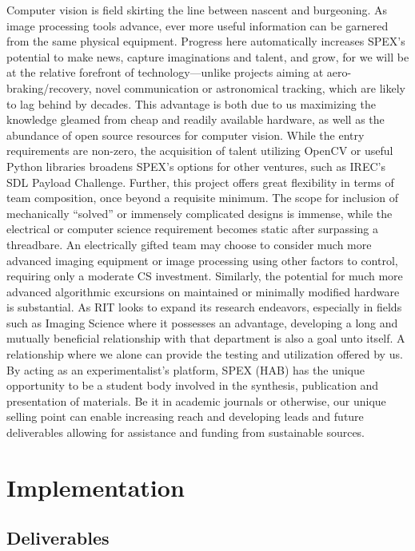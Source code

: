 \documentclass[conference]{IEEEtran} %
\begin{document}
Computer vision is field skirting the line between nascent and burgeoning. 
As image processing tools advance, ever more useful information can be garnered from the same physical equipment. 
Progress here automatically increases SPEX's potential to make news, capture imaginations and talent, and grow, for we will be at the relative forefront of technology---unlike projects aiming at aero-braking/recovery, novel communication or astronomical tracking, which are likely to lag behind by decades. 
This advantage is both due to us maximizing the knowledge gleamed from cheap and readily available hardware, as well as the abundance of open source resources for computer vision. 
While the entry requirements are non-zero, the acquisition of talent utilizing OpenCV or useful Python libraries broadens SPEX's options for other ventures, such as IREC's SDL Payload Challenge. 
Further, this project offers great flexibility in terms of team composition, once beyond a requisite minimum. 
The scope for inclusion of mechanically ``solved'' or immensely complicated designs is immense, while the electrical or computer science requirement becomes static after surpassing a threadbare. 
An electrically gifted team may choose to consider much more advanced imaging equipment or image processing using other factors to control, requiring only a moderate CS investment. 
Similarly, the potential for much more advanced algorithmic excursions on maintained or minimally modified hardware is substantial. 
As RIT looks to expand its research endeavors, especially in fields such as Imaging Science where it possesses an advantage, developing a long and mutually beneficial relationship with that department is also a goal unto itself. 
A relationship where we alone can provide the testing and utilization offered by us. 
By acting as an experimentalist's platform, SPEX (HAB) has the unique opportunity to be a student body involved in the synthesis, publication and presentation of materials. 
Be it in academic journals or otherwise, our unique selling point can enable increasing reach and developing leads and future deliverables allowing for assistance and funding from sustainable sources.

\section{Implementation}
\label{implementation}
\subsection{Deliverables}
\label{deliverables}
\end{document}
